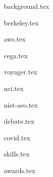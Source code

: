 \documentclass[11pt]{article}
\begin{document}
{background.tex}


{berkeley.tex}


{aws.tex}

{cega.tex}

{voyager.tex}

{nci.tex}

{nist-aeo.tex}


{debate.tex}

{covid.tex}


{skills.tex}


{awards.tex}
\end{document}
